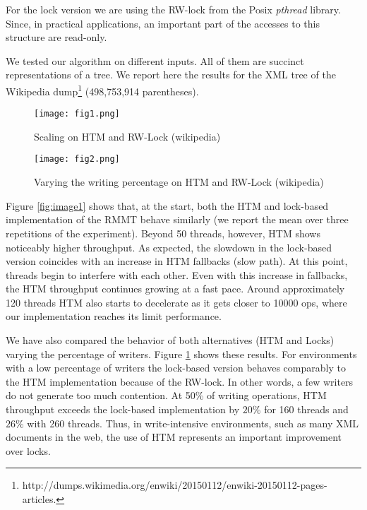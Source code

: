 \documentclass{llncs}
\begin{document}
For the lock version we are using the RW-lock from the Posix {\em pthread} library. Since, in practical applications, an important part of the accesses to this structure are read-only.

We tested our algorithm on different inputs. All of them are succinct representations of a tree. We report here the results for the XML tree of the Wikipedia dump\footnote{http://dumps.wikimedia.org/enwiki/20150112/enwiki-20150112-pages-articles.} (498,753,914 parentheses).

\begin{figure}[t]
  \begin{minipage}{0.48\linewidth}
     \texttt{[image: fig1.png]}
     \caption{Scaling on HTM and RW-Lock (wikipedia)}
     \label{fig:image1}
  \end{minipage}
  \hfill
  \begin{minipage}{0.5\linewidth}
    \hfill
    \texttt{[image: fig2.png]}
    \caption{Varying the writing percentage on HTM and RW-Lock (wikipedia)}
    \label{fig:image2}
  \end{minipage}
  \vspace{-4mm}
\end{figure}

Figure \ref{fig:image1} shows that, at the start, both the HTM and lock-based implementation of the RMMT behave similarly (we report the mean over three repetitions of the experiment). Beyond 50 threads, however, HTM shows noticeably higher throughput. As expected, the slowdown in the lock-based version coincides with an increase in HTM fallbacks (slow path). At this point, threads begin to interfere with each other. Even with this increase in fallbacks, the HTM throughput continues growing at a fast pace. Around approximately 120 threads HTM also starts to decelerate as it gets closer to 10000 ops, where our implementation reaches its limit performance.

We have also compared the behavior of both alternatives (HTM and Locks) varying the percentage of writers. Figure \ref{fig:image2} shows these results. For environments with a low percentage of writers the lock-based version behaves comparably to the HTM implementation because of the RW-lock. In other words, a few writers do not generate too much contention. At 50\% of writing operations, HTM throughput exceeds the lock-based implementation by $20\%$ for 160 threads and $26\%$ with 260 threads. Thus, in write-intensive environments, such as many XML documents in the web, the use of HTM represents an important improvement over locks.
\vspace{-2mm}
\end{document}
